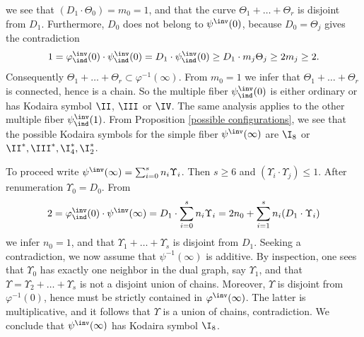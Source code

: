 we see that $(D_1\cdot\Theta_0)=m_0=1$, and that the curve $\Theta_1+\ldots+\Theta_r$  is disjoint from $D_1$.
Furthermore, $D_0$ does not belong to $\psi^\inv(0)$, because   $D_0=\Theta_j$ gives the contradiction
$$
1=\varphi^\inv_\ind(0)\cdot\psi^\inv_\ind(0) = D_1\cdot\psi^\inv_\ind(0)\geq D_1\cdot m_j\Theta_j\geq 2m_j\geq 2.
$$
Consequently $\Theta_1+\ldots+\Theta_r\subset\varphi^{-1}(\infty)$.
From $m_0=1$ we infer that  $\Theta_1+\ldots+\Theta_r$ is connected, hence is a chain. So the multiple fiber $\psi^\inv_\ind(0)$ is either
ordinary or has Kodaira symbol $\II$, $\III$ or $\IV$.
The same analysis applies to the other multiple fiber $\psi^\inv_\ind(1)$.
From Proposition \ref{possible configurations}, we see that the possible Kodaira symbols for  the simple fiber $\psi^\inv(\infty)$
are $\I_8$ or $\II^*, \III^*, \I_4^*, \I_2^*$.

To proceed write  $\psi^\inv(\infty)=\sum_{i=0}^s n_i\Upsilon_i$. Then $s\geq 6$ and  $(\Upsilon_i\cdot\Upsilon_j)\leq 1$. After renumeration $\Upsilon_0=D_0$. From
$$
2=\varphi^\inv_\ind(0)\cdot\psi^\inv(\infty) = D_1\cdot\sum_{i=0}^s n_i\Upsilon_i = 2n_0 + \sum_{i=1}^s n_i(D_1\cdot\Upsilon_i)
$$
we infer $n_0=1$, and that $\Upsilon_1+\ldots+\Upsilon_s$ is disjoint from $D_1$.
Seeking a contradiction, we now assume that $\psi^{-1}(\infty)$ is additive. By inspection, one sees that  $\Upsilon_0$ has exactly one neighbor in the dual graph,
say $\Upsilon_1$, and  that $\Upsilon=\Upsilon_2+\ldots+\Upsilon_s$ is not a disjoint union of chains.
Moreover, $\Upsilon$ is disjoint from $\varphi^{-1}(0)$, hence must be strictly
contained in $\varphi^\inv(\infty)$. The latter is multiplicative, and it follows that $\Upsilon$ is a union of chains, contradiction.
We conclude that $\psi^\inv(\infty)$ has Kodaira symbol $\I_8$.

